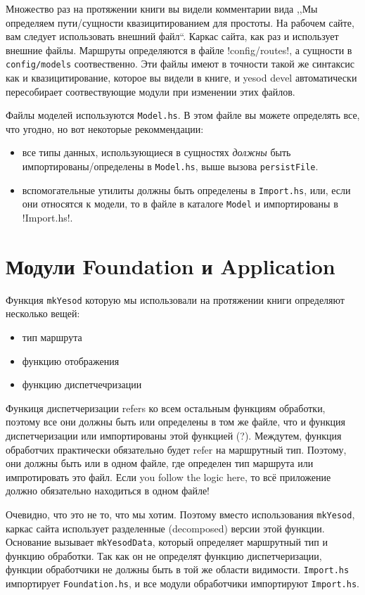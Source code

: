 Множество раз на протяжении книги вы видели комментарии вида ,,Мы определяем пути/сущности
квазицитированием для простоты. На рабочем сайте, вам следует использовать внешний файл``.
Каркас сайта, как раз и использует внешние файлы.
Маршруты определяются в файле \lstiniline!config/routes!, а сущности в \lstinline!config/models!
соотвественно. Эти файлы имеют в точности такой же синтаксис как и квазицитирование, которое вы
видели в книге, и yesod devel автоматически пересобирает соотвествующие модули при изменении этих файлов.

Файлы моделей используются \lstinline!Model.hs!. В этом файле вы можете определять все, что угодно, но
вот некоторые рекоммендации:
\begin{itemize}
    \item все типы данных, использующиеся в сущностях \emph{должны} быть импортированы/определены
      в \lstinline!Model.hs!, выше вызова \lstinline!persistFile!.
    \item вспомогательные утилиты должны быть определены в \lstinline!Import.hs!, или, если они
      относятся к модели, то в файле в каталоге \lstinline!Model! и импортированы в \lstlinline!Import.hs!.
\end{itemize}

\section{Модули Foundation и Application}

Функция \lstinline!mkYesod! которую мы использовали на протяжении книги определяют несколько вещей:

\begin{itemize}
  \item тип маршрута
  \item функцию отображения
  \item функцию диспетчечризации
\end{itemize}

Функиця диспетчеризации refers ко всем остальным функциям обработки, поэтому все они должны быть 
или определены в том же файле, что и функция диспетчеризации или импортированы этой функцией (?). %
Междутем, функция обработчих практически обязательно будет refer на маршрутный тип. Поэтому,
они должны быть или в одном файле, где определен тип маршрута или импротировать это файл.
Если you follow the logic here, то всё приложение должно обязательно находиться в одном файле!

Очевидно, что это не то, что мы хотим. Поэтому вместо использования \lstinline!mkYesod!, каркас 
сайта использует разделенные (decomposed) версии этой функции. Основание вызывает \lstinline!mkYesodData!,
который определяет маршрутный тип и функцию обработки. Так как он не определят функцию диспетчеризации,
функции обработчики не должны быть в той же области видимости. \texttt{Import.hs} импортирует
\texttt{Foundation.hs}, и все модули обработчики импортируют \texttt{Import.hs}.

